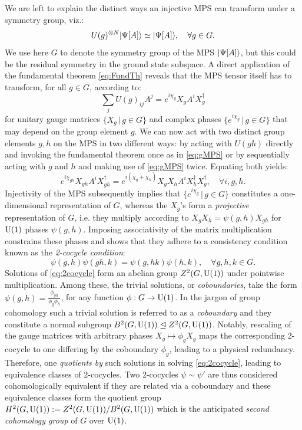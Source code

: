 \bigskip\noindent We are left to explain the distinct ways an injective MPS can transform under a symmetry group, viz.:
\begin{equation}
	U(g)^{\otimes N} |\Psi[A]\rangle \simeq |\Psi[A]\rangle, \quad \forall g \in G.
\end{equation}
We use here $G$ to denote the symmetry group of the MPS $|\Psi[A]\rangle$, but this could be the residual symmetry in the ground state subspace. A direct application of the fundamental theorem \cref{eq:FundTh} reveals that the MPS tensor itself has to transform, for all $g \in G$, according to:
\begin{equation}\label{eq:gMPS}
	\sum_j U(g)_{ij} A^j = e^{i\chi_g} X_gA^iX_g^\dagger
\end{equation}
for unitary gauge matrices $\{X_g\, |\,  g\in G\}$ and complex phases $\{e^{i\chi_g}\, |\, g\in G\}$ that may depend on the group element $g$. We can now act with two distinct group elements $g,h$ on the MPS in two different ways: by acting with $U(gh)$ directly and invoking the fundamental theorem once as in \cref{eq:gMPS} or by sequentially acting with $g$ and $h$ and making use of \cref{eq:gMPS} twice. Equating both yields:
\begin{equation}
	e^{i\chi_{gh}}X_{gh} A^i X_{gh}^\dagger = e^{i(\chi_g+\chi_h)}X_gX_h A^i X_h^\dagger X_g^\dagger,\quad\forall i,g,h.
\end{equation}
Injectivity of the MPS subsequently implies that $\{e^{i\chi_g}\, |\, g\in G\}$ constitutes a one-dimensional representation of $G$, whereas the $X_g$'s form a \emph{projective} representation of $G$, i.e. they multiply according to $X_gX_h = \psi(g,h) X_{gh}$ for ${\rm U}(1)$ phases $\psi(g,h)$. Imposing associativity of the matrix multiplication constrains these phases and shows that they adhere to a consistency condition known as the \emph{2-cocycle condition}:
\begin{equation}\label{eq:2cocycle}
	\psi(g,h)\psi(gh,k) = \psi(g,hk)\psi(h,k), \quad \forall g,h,k\in G.
\end{equation}
Solutions of \cref{eq:2cocycle} form an abelian group $Z^2(G,{\rm U}(1))$ under pointwise multiplication.	 Among these, the trivial solutions, or \emph{coboundaries}, take the form $\psi(g,h)=\frac{\phi_{gh}}{\phi_g \phi_h}$, for any function $\phi:G\rightarrow{\rm U}(1)$. In the jargon of group cohomology such a trivial solution is referred to as a \emph{coboundary} and they constitute a normal subgroup $B^2(G,{\rm U}(1))\trianglelefteq Z^2(G,{\rm U}(1))$. Notably, rescaling of the gauge matrices with arbitrary phases $X_g \mapsto \phi_g X_g$ maps the corresponding 2-cocycle to one differing by the coboundary $\phi_g$, leading to a physical redundancy. Therefore, one \emph{quotients by} such solutions in solving \cref{eq:2cocycle}, leading to equivalence classes of 2-cocycles. Two 2-cocycles $\psi\sim\psi'$ are thus considered cohomologically equivalent if they are related via a coboundary and these equivalence classes form the quotient group $H^2(G,{\rm U}(1)):= Z^2(G,{\rm U}(1))/B^2(G,{\rm U}(1))$ which is the anticipated \emph{second cohomology group} of $G$ over ${\rm U}(1)$.

